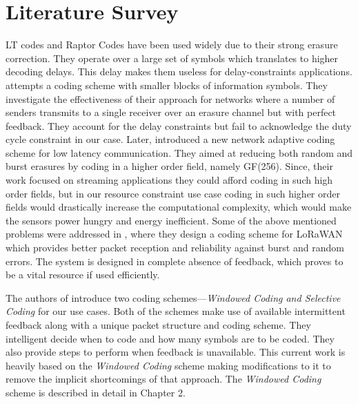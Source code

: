\newpage
\section{Literature Survey}
\label{LiteratureSurvey}

LT codes \cite{ltcode} and Raptor Codes \cite{raptor} have been used widely due to their strong erasure correction. They operate over a large set of symbols which translates to higher decoding delays. This delay makes them useless for delay-constraints applications. \cite{DRINEA2013100} attempts a coding scheme with smaller blocks of information symbols. They investigate the effectiveness of their approach for networks where a number of senders transmits to a single receiver over an erasure channel but with perfect feedback. They account for the delay constraints but fail to acknowledge the duty cycle constraint in our case. Later,\cite{Fong} introduced a new network adaptive coding scheme for low latency communication. They aimed at reducing both random and burst erasures by coding in a higher order field, namely GF(256). Since, their work focused on streaming applications they could afford coding in such high order fields, but in our resource constraint use case coding in such higher order fields would drastically increase the computational complexity, which would make the sensors power hungry and energy inefficient. Some of the above mentioned problems were addressed in \cite{DaRe}, where they design a coding scheme for LoRaWAN which provides better packet reception and reliability against burst and random errors. The system is designed in complete absence of feedback, which proves to be a vital resource if used efficiently.

The authors of \cite{borkotokyicc} introduce two coding schemes---\textit{Windowed Coding and Selective Coding} for our use cases. Both of the schemes make use of available intermittent feedback along with a unique packet structure and coding scheme. They intelligent decide when to code and how many symbols are to be coded. They also provide steps to perform when feedback is unavailable. This current work is heavily based on the \textit{Windowed Coding} scheme making modifications to it to remove the implicit shortcomings of that approach. The \textit{Windowed Coding} scheme is described in detail in Chapter 2. 


